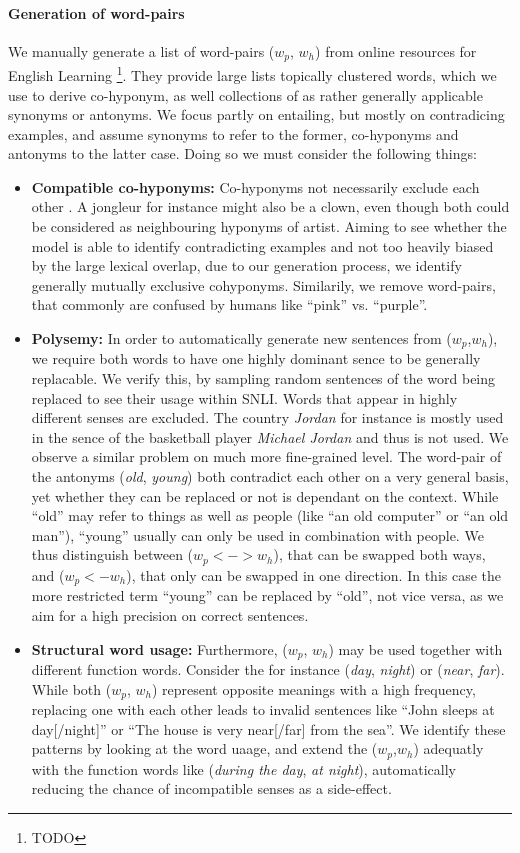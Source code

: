 \paragraph*{Generation of word-pairs}
We manually generate a list of word-pairs ($w_p$, $w_h$) from online resources for English Learning \footnote{TODO}. They provide large lists topically clustered words, which we use to derive co-hyponym, as well collections of as rather generally applicable synonyms or antonyms. We focus partly on entailing, but mostly on contradicing examples, and assume synonyms to refer to the former,  co-hyponyms and antonyms to the latter case. Doing so we must consider the following things:
\begin{itemize}
\item \textbf{Compatible co-hyponyms:} Co-hyponyms not necessarily exclude each other \citep{kruszewski2015so}. A jongleur for instance might also be a clown, even though both could be considered as neighbouring hyponyms of artist. Aiming to see whether the model is able to identify contradicting examples and not too heavily biased by the large lexical overlap, due to our generation process, we identify generally mutually exclusive cohyponyms. Similarily, we remove word-pairs, that commonly are confused by humans like ``pink'' vs. ``purple''. 
\item \textbf{Polysemy:} In order to automatically generate new sentences from ($w_p$,$w_h$), we require both words to have one highly dominant sence to be generally replacable. We verify this, by sampling random sentences of the word being replaced to see their usage within \ac{SNLI}. Words that appear in highly different senses are excluded. The country \textit{Jordan} for instance is mostly used in the sence of the basketball player \textit{Michael Jordan} and thus is not used. We observe a similar problem on much more fine-grained level. The word-pair of the antonyms (\textit{old}, \textit{young}) both contradict each other on a very general basis, yet whether they can be replaced or not is dependant on the context. While ``old'' may refer to things as well as people (like ``an old computer'' or ``an old man''), ``young'' usually can only be used in combination with people. We thus distinguish between ($w_p <-> w_h$), that can be swapped both ways, and ($w_p <- w_h$), that only can be swapped in one direction. In this case the more restricted term ``young'' can be replaced by ``old'', not vice versa, as we aim for a high precision on correct sentences.
\item \textbf{Structural word usage:} Furthermore, ($w_p$, $w_h$) may be used together with different function words. Consider the for instance (\textit{day}, \textit{night}) or (\textit{near}, \textit{far}). While both ($w_p$, $w_h$) represent opposite meanings with a high frequency, replacing one with each other leads to invalid sentences like ``John sleeps at day[/night]'' or ``The house is very near[/far] from the sea''. We identify these patterns by looking at the word uaage, and extend the ($w_p$,$w_h$) adequatly with the function words like (\textit{during the day}, \textit{at night}), automatically reducing the chance of incompatible senses as a side-effect.
\end{itemize}
